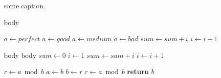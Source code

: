 \begin{algorithm}[ht]
	\caption{some caption.}
	\begin{algorithmic}[1]

			\State body
		\EndFor

				\ENDFOR
			\ENDFOR
		\ENDFOR

			\State $a\gets perfect$
			\State $a\gets good$
			\State $a\gets medium$
			\State $a\gets bad$
		\Else
				\State $sum\gets sum+i$
				\State $i\gets i+1$
			\EndWhile
		\EndIf

			\State body
			\Loop
				\State body
			\EndLoop
			\State $sum\gets 0$
			\State $i\gets 1$
			\Repeat
				\State $sum\gets sum+i$
				\State $i\gets i+1$
		\EndFor

			\State $r\gets a\bmod b$
				\State $a\gets b$
				\State $b\gets r$
				\State $r\gets a\bmod b$
			\EndWhile
			\State \textbf{return} $b$
		\EndFunction
	\end{algorithmic}
\end{algorithm}